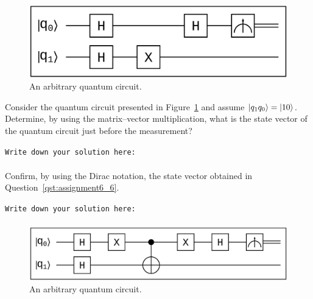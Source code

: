 \begin{figure}[t]
  \centerline{\includegraphics[scale=0.35]{img/qci_a6_question6.ps}}
  \caption{An arbitrary quantum circuit.}
  \label{fig:circuit4}
\end{figure}

\begin{question}
Consider the quantum circuit presented in Figure~\ref{fig:circuit4} and assume $\ket{q_{1}q_{0}} = \ket{10}$. Determine, by using the matrix--vector multiplication, what is the state vector of the quantum circuit just before the measurement?
\label{qst:assignment6_6}
\end{question}
{\small
\texttt{Write down your solution here:}
\begin{equation*}
  \begin{split}
  \end{split}
\end{equation*}}
\vspace{0.1cm}

\begin{question}
Confirm, by using the Dirac notation, the state vector obtained in Question~\ref{qst:assignment6_6}.
\label{qst:assignment6_7}
\end{question}
{\small
\texttt{Write down your solution here:}
\begin{equation*}
  \begin{split}
  \end{split}
\end{equation*}}
\vspace{0.1cm}

\begin{figure}[t]
  \centerline{\includegraphics[scale=0.25]{img/qci_a6_question8.ps}}
  \caption{An arbitrary quantum circuit.}
  \label{fig:circuit5}
\end{figure}

